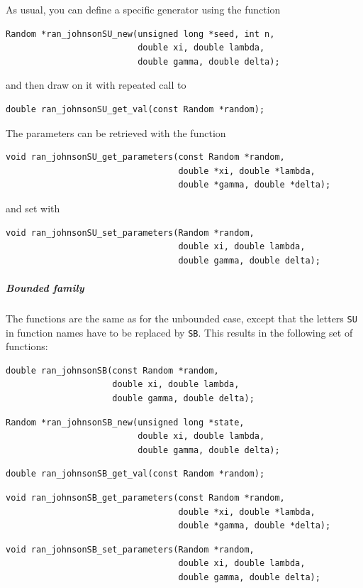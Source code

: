 As usual, you can define a specific generator using the function
\begin{verbatim}
Random *ran_johnsonSU_new(unsigned long *seed, int n,
                          double xi, double lambda,
                          double gamma, double delta);
\end{verbatim}
and then draw on it with repeated call to
\begin{verbatim}
double ran_johnsonSU_get_val(const Random *random);
\end{verbatim}

The parameters can be retrieved with the function
\begin{verbatim}
void ran_johnsonSU_get_parameters(const Random *random,
                                  double *xi, double *lambda,
                                  double *gamma, double *delta);
\end{verbatim}
and set with
\begin{verbatim}
void ran_johnsonSU_set_parameters(Random *random,
                                  double xi, double lambda, 
                                  double gamma, double delta);
\end{verbatim}

\subparagraph{Bounded family}

The functions are the same as for the unbounded case, except that the
letters \verb|SU| in function names have to be replaced by \verb|SB|.
This results in the following set of functions:
\begin{verbatim}
double ran_johnsonSB(const Random *random,
                     double xi, double lambda,
                     double gamma, double delta);
\end{verbatim}
\begin{verbatim}
Random *ran_johnsonSB_new(unsigned long *state,
                          double xi, double lambda,
                          double gamma, double delta);
\end{verbatim}
\begin{verbatim}
double ran_johnsonSB_get_val(const Random *random);
\end{verbatim}
\begin{verbatim}
void ran_johnsonSB_get_parameters(const Random *random,
                                  double *xi, double *lambda,
                                  double *gamma, double *delta);
\end{verbatim}
\begin{verbatim}
void ran_johnsonSB_set_parameters(Random *random,
                                  double xi, double lambda, 
                                  double gamma, double delta);
\end{verbatim}

